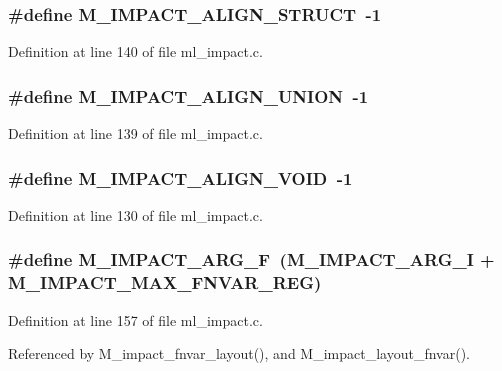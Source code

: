 \subsubsection{\setlength{\rightskip}{0pt plus 5cm}\#define M\_\-IMPACT\_\-ALIGN\_\-STRUCT~-1}\label{ml__impact_8c_d85278b5ca39a38b04992b24c30f60f8}




Definition at line 140 of file ml\_\-impact.c.
\subsubsection{\setlength{\rightskip}{0pt plus 5cm}\#define M\_\-IMPACT\_\-ALIGN\_\-UNION~-1}\label{ml__impact_8c_c9f22d73b371355310c4348d88bd0e8e}




Definition at line 139 of file ml\_\-impact.c.
\subsubsection{\setlength{\rightskip}{0pt plus 5cm}\#define M\_\-IMPACT\_\-ALIGN\_\-VOID~-1}\label{ml__impact_8c_05e51ea689c646304b2422fd6ba3307c}




Definition at line 130 of file ml\_\-impact.c.
\subsubsection{\setlength{\rightskip}{0pt plus 5cm}\#define M\_\-IMPACT\_\-ARG\_\-F~(M\_\-IMPACT\_\-ARG\_\-I + M\_\-IMPACT\_\-MAX\_\-FNVAR\_\-REG)}\label{ml__impact_8c_d56fc73a7e4d34dd9e1afeed5a9dd62f}




Definition at line 157 of file ml\_\-impact.c.

Referenced by M\_\-impact\_\-fnvar\_\-layout(), and M\_\-impact\_\-layout\_\-fnvar().
